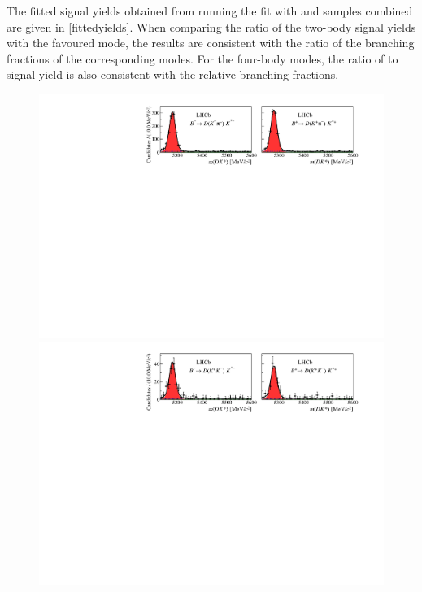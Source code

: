 The fitted signal yields obtained from running the fit with \Bp and \Bm samples combined are given in \tab\ref{fittedyields}. When comparing the ratio of the two-body signal yields with the favoured mode, the results are consistent with the ratio of the branching fractions of the corresponding \Dz modes. For the four-body modes, the ratio of \kpipipi to \pipipipi signal yield is also consistent with the relative branching fractions.

\begin{figure}
\includegraphics[width=\linewidth]{figures/results/canvas_d2kpi.pdf}
\hfill
\includegraphics[width=\linewidth]{figures/results/canvas_d2kk.pdf}
\hfill

\end{figure}
